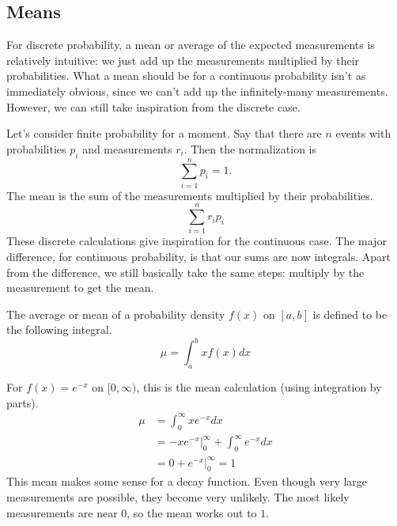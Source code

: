 \documentclass[fleqn]{report}
\begin{document}
\subsection{Means}
\label{means}

For discrete probability, a mean or average of the expected
measurements is relatively intuitive: we just add up the
measurements multiplied by their probabilities. What a
mean should be for a continuous probability isn't as
immediately obvious, since we can't add up the
infinitely-many measurements. However, we can still take
inspiration from the discrete case. 

Let's consider finite probability for a moment. Say that there
are $n$ events with probabilities $p_i$ and measurements
$r_i$. Then the normalization is
\begin{equation*}
\sum_{i=1}^n p_i = 1.
\end{equation*}
The mean is the sum of the measurements multiplied by their
probabilities.
\begin{equation*}
\sum_{i=1}^n r_i p_i
\end{equation*}
These discrete calculations give inspiration for the
continuous case. The major difference, for continuous
probability, is that our sums are now integrals. Apart from
the difference, we still basically take the same steps:
multiply by the measurement to get the mean. 

\begin{defn}
The average or mean of a probability density $f(x)$ on $[a,b]$
is defined to be the following integral. 
\begin{equation*}
\mu = \int_a^b x f(x) dx
\end{equation*}
\end{defn}

\begin{example}
For $f(x) = e^{- x}$ on $[0, \infty)$, this is
the mean calculation (using integration by parts).
\begin{align*}
\mu & = \int_0^\infty x e^{-x} dx \\
& = \left. - x e^{-x} \right|_0^\infty + \int_0^\infty
e^{-x} dx \\
& = 0 + \left. e^{-x} \right|_0^\infty = 1
\end{align*}
This mean makes some sense for a decay function. Even though very
large measurements are possible, they become very unlikely.
The most likely measurements are near $0$, so the mean works
out to $1$.
\end{example}
\end{document}
